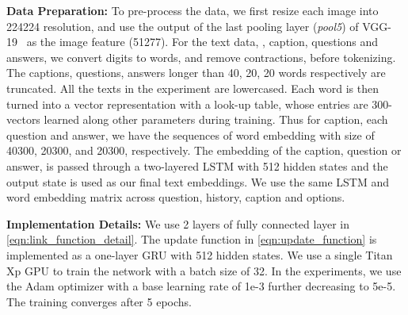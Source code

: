 \documentclass[10pt,twocolumn,letterpaper]{article}
\begin{document}
\noindent\textbf{Data Preparation:} To pre-process the data, we first resize each image into 224224 resolution, and use the output of the last pooling layer (\textit{pool5}) of VGG-19~\cite{simonyan2014very} as the image feature (51277). For the text data, \ie, caption, questions and answers, we convert digits to words, and remove contractions, before tokenizing.
The captions, questions, answers longer than 40, 20, 20 words respectively are truncated.
All the texts in the experiment are lowercased. Each word is then turned into a vector representation with a look-up table, whose entries are 300- vectors learned along other parameters during training. Thus for caption, each question and answer, we have the sequences of word embedding with size of 40300, 20300, and 20300, respectively. The embedding of the caption, question or answer, is passed through a two-layered LSTM with 512 hidden states and the output state is used as our final text embeddings. We use the same LSTM and word embedding matrix across question, history, caption and options.




\noindent\textbf{Implementation Details:} We use 2 layers of fully connected layer in \autoref{eqn:link_function_detail}. The update function  in \autoref{eqn:update_function} is implemented as a one-layer GRU with 512 hidden states. We use a single Titan Xp GPU to train the network with a batch size of 32. In the experiments, we use the Adam optimizer with a base learning rate of 1e-3 further decreasing to 5e-5. The training converges after 5 epochs.
\end{document}
